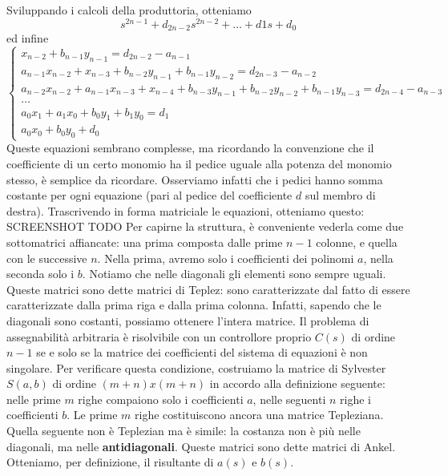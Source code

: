 \documentclass[11pt]{article}
\begin{document}
Sviluppando i calcoli della produttoria, otteniamo
\begin{displaymath}
    s^{2n-1}+d_{2n-2}s^{2n-2}+\dots+d1s+d_0
\end{displaymath}
ed infine
\begin{displaymath}
    \begin{cases}
        x_{n-2}+b_{n-1}y_{n-1} = d_{2n-2}-a_{n-1}                                                             \\
        a_{n-1}x_{n-2}+x_{n-3}+b_{n-2}y_{n-1} + b_{n-1}y_{n-2} = d_{2n-3}-a_{n-2}                             \\
        a_{n-2}x_{n-2}+a_{n-1}x_{n-3}+x_{n-4}+b_{n-3}y_{n-1}+b_{n-2}y_{n-2}+b_{n-1}y_{n-3} = d_{2n-4}-a_{n-3} \\
        \dots                                                                                                 \\
        a_0x_1+a_1x_0+b_0y_1+b_1y_0=d_1                                                                       \\
        a_0x_0+b_0y_0+d_0
    \end{cases}
\end{displaymath}
Queste equazioni sembrano complesse, ma ricordando la convenzione che il coefficiente di un certo monomio ha il pedice uguale alla potenza del monomio stesso, è semplice da ricordare. Osserviamo infatti che i pedici hanno somma costante per ogni equazione (pari al pedice del coefficiente $d$ sul membro di destra).
Trascrivendo in forma matriciale le equazioni, otteniamo questo:
SCREENSHOT TODO
Per capirne la struttura, è conveniente vederla come due sottomatrici affiancate: una prima composta dalle prime $n-1$ colonne, e quella con le successive $n$. Nella prima, avremo solo i coefficienti dei polinomi $a$, nella seconda solo i $b$. Notiamo che nelle diagonali gli elementi sono sempre uguali. Queste matrici sono dette matrici di Teplez: sono caratterizzate dal fatto di essere caratterizzate dalla prima riga e dalla prima colonna. Infatti, sapendo che le diagonali sono costanti, possiamo ottenere l'intera matrice.
Il problema di assegnabilità arbitraria è risolvibile con un controllore proprio $C(s)$ di ordine $n-1$ se e solo se la matrice dei coefficienti del sistema di equazioni è non singolare. Per verificare questa condizione, costruiamo la matrice di Sylvester $S(a,b)$ di ordine $(m+n)x(m+n)$ in accordo alla definizione seguente: nelle prime $m$ righe compaiono solo i coefficienti $a$, nelle seguenti $n$ righe i coefficienti $b$. Le prime $m$ righe costituiscono ancora una matrice Tepleziana. Quella seguente non è Teplezian ma è simile: la costanza non è più nelle diagonali, ma nelle \textbf{antidiagonali}. Queste matrici sono dette matrici di Ankel. Otteniamo, per definizione, il risultante di $a(s)$ e $b(s)$.
\end{document}
